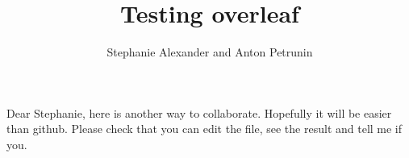 \documentclass{article}
\begin{document}
 
\title{Testing overleaf}
\author{Stephanie Alexander and Anton Petrunin}
\date{}
\maketitle

Dear Stephanie, here is another way to collaborate.
Hopefully it will be easier than github.
Please check that you can edit the file, see the result and tell me if you.
\end{document}
